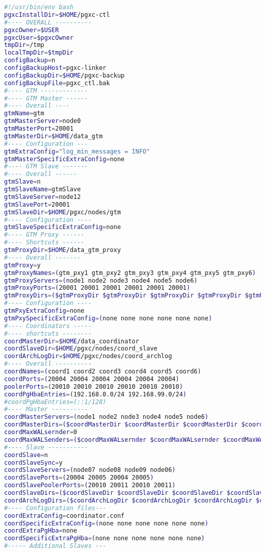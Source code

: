 \label{appendix:pgxcctlconfig} 
\begin{lstlisting}[basicstyle=\tiny,language=bash,caption={Konfigurationsdatei pgxc-ctl},captionpos=b]
#!/usr/bin/env bash
pgxcInstallDir=$HOME/pgxc-ctl
#---- OVERALL ----------
pgxcOwner=$USER	
pgxcUser=$pgxcOwner
tmpDir=/tmp
localTmpDir=$tmpDir	
configBackup=n	
configBackupHost=pgxc-linker
configBackupDir=$HOME/pgxc-backup
configBackupFile=pgxc_ctl.bak
#---- GTM -------------
#---- GTM Master ------
#---- Overall ----
gtmName=gtm
gtmMasterServer=node0
gtmMasterPort=20001
gtmMasterDir=$HOME/data_gtm
#---- Configuration ---
gtmExtraConfig="log_min_messages = INFO"
gtmMasterSpecificExtraConfig=none
#---- GTM Slave -------
#---- Overall ------
gtmSlave=n	
gtmSlaveName=gtmSlave
gtmSlaveServer=node12
gtmSlavePort=20001
gtmSlaveDir=$HOME/pgxc/nodes/gtm
#---- Configuration ----
gtmSlaveSpecificExtraConfig=none 
#---- GTM Proxy ------
#---- Shortcuts ------
gtmProxyDir=$HOME/data_gtm_proxy
#---- Overall -------
gtmProxy=y	
gtmProxyNames=(gtm_pxy1 gtm_pxy2 gtm_pxy3 gtm_pxy4 gtm_pxy5 gtm_pxy6)
gtmProxyServers=(node1 node2 node3 node4 node5 node6)
gtmProxyPorts=(20001 20001 20001 20001 20001 20001)
gtmProxyDirs=($gtmProxyDir $gtmProxyDir $gtmProxyDir $gtmProxyDir $gtmProxyDir $gtmProxyDir)
#---- Configuration ----
gtmPxyExtraConfig=none
gtmPxySpecificExtraConfig=(none none none none none none)
#---- Coordinators -----
#---- shortcuts --------
coordMasterDir=$HOME/data_coordinator
coordSlaveDir=$HOME/pgxc/nodes/coord_slave
coordArchLogDir=$HOME/pgxc/nodes/coord_archlog
#---- Overall ----------
coordNames=(coord1 coord2 coord3 coord4 coord5 coord6)
coordPorts=(20004 20004 20004 20004 20004 20004)
poolerPorts=(20010 20010 20010 20010 20010 20010)
coordPgHbaEntries=(192.168.0.0/24 192.168.99.0/24)
#coordPgHbaEntries=(::1/128)
#---- Master ----------
coordMasterServers=(node1 node2 node3 node4 node5 node6)
coordMasterDirs=($coordMasterDir $coordMasterDir $coordMasterDir $coordMasterDir $coordMasterDir $coordMasterDir)
coordMaxWALsernder=0
coordMaxWALSenders=($coordMaxWALsernder $coordMaxWALsernder $coordMaxWALsernder $coordMaxWALsernder $coordMaxWALsernder $coordMaxWALsernder )
#---- Slave -----------
coordSlave=n
coordSlaveSync=y
coordSlaveServers=(node07 node08 node09 node06)
coordSlavePorts=(20004 20005 20004 20005)
coordSlavePoolerPorts=(20010 20011 20010 20011)
coordSlaveDirs=($coordSlaveDir $coordSlaveDir $coordSlaveDir $coordSlaveDir)
coordArchLogDirs=($coordArchLogDir $coordArchLogDir $coordArchLogDir $coordArchLogDir)
#---- Configuration files---
coordExtraConfig=coordinator.conf
coordSpecificExtraConfig=(none none none none none none)
coordExtraPgHba=none
coordSpecificExtraPgHba=(none none none none none none)
#----- Additional Slaves ---


\end{lstlisting}
